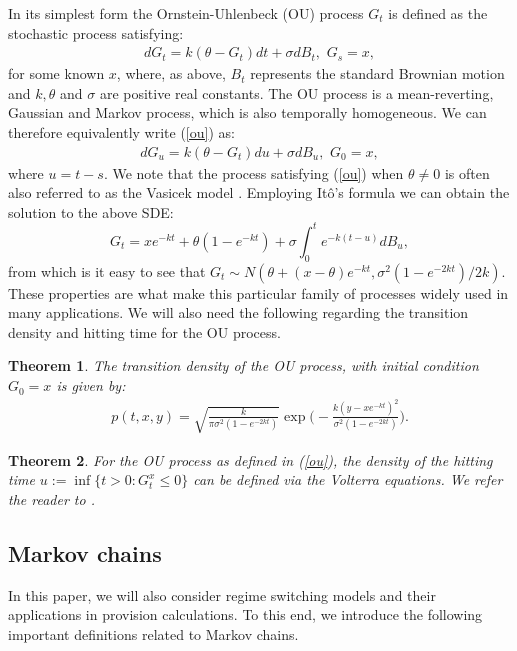 \documentclass[11pt,reqno]{article}
\newtheorem{theorem}{Theorem}[section]
\theoremstyle{definition}
\begin{document}
In its simplest form the Ornstein-Uhlenbeck (OU) process $G_t$ is defined as the stochastic process satisfying: 
\begin{eqnarray}\label{ou}
	dG_t=k(\theta - G_t)dt + \sigma dB_t, \,\, G_s=x, 
\end{eqnarray}
for some known $x$, where, as above, $B_t$ represents the standard Brownian motion and $k, \theta$ and $\sigma$ are positive real constants. The OU process is a mean-reverting, Gaussian and Markov process, which is also temporally homogeneous. We can therefore equivalently write (\ref{ou}) as:
\begin{eqnarray}
	dG_u=k(\theta - G_t)du+ \sigma dB_u, \,\, G_0=x,
\end{eqnarray}
where $u = t-s$. 
We note that the process satisfying (\ref{ou}) when $\theta \neq 0$ is often also referred to as the Vasicek model \cite{vasicek1977equilibrium}. Employing It\^o's formula we can obtain the solution to the above SDE:
$$ G_t = x e ^{-kt}+ \theta(1-e^{-kt}) + \sigma \int_{0}^{t} e^ {-k(t-u)}dB_u,$$
from which is it easy to see that $G_t \sim N(\theta + (x - \theta) e^{-kt}, \sigma^2(1-e^{-2kt})/2k).$
These properties are what make this particular family of processes widely used in many applications. We will also need the following regarding the transition density and hitting time for the OU process.

\begin{theorem}\label{td}
	The transition density of the OU process, with initial condition $G_0=x$ is given by: 
	\begin{eqnarray}
		p(t,x,y) = \sqrt{\frac{k}{\pi \sigma^2 (1-e^{-2kt})}} \exp\Big(-\frac{k(y-x e^{-kt})^2}{\sigma^2 (1-e^{-2kt})}\Big).
	\end{eqnarray}
\end{theorem}

\begin{theorem}\label{sp} For the OU process as defined in (\ref{ou}), the density of the hitting time $u := \inf\{t>0: G_t^x \leq 0\}$ can be defined via the Volterra equations. We refer the reader to \cite{lipton2018first}.
\end{theorem}


\subsection{Markov chains}
In this paper, we will also consider regime switching models and their applications in provision calculations. To this end, we introduce the following important definitions related to Markov chains.
\end{document}
